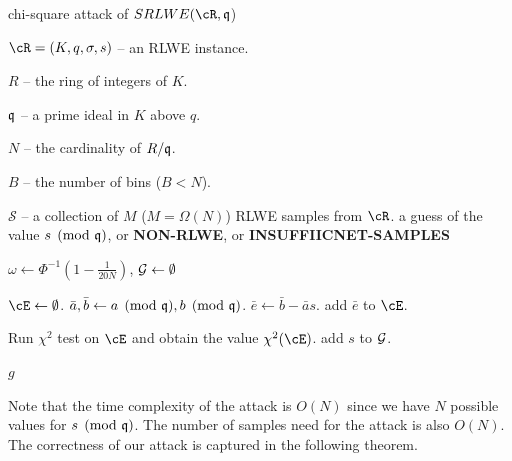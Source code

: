 \documentclass{amsart}
\begin{document}
\begin{algorithm}[H] \label{alg: chi-square}
\caption{chi-square attack of $SRLWE(\cR,\fq$)}          %
\label{IPR}                           %
\begin{algorithmic}[1]              %
     \Require

     $\cR = (K,q,\sigma, s)$ -- an RLWE instance.

     $R$ -- the ring of integers of $K$.

     $\mathfrak{q}$ -- a prime ideal in $K$ above $q$.

     $N$ -- the cardinality of $R/\mathfrak{q}$.

     $B$ -- the number of bins ($B < N$).

     $\mathcal{S}$ -- a collection of $M$ ($M = \Omega(N)$) RLWE samples from $\cR$.
    \Ensure a guess of the value $s \pmod{\mathfrak{q}}$, or {\bf NON-RLWE}, or {\bf INSUFFIICNET-SAMPLES}

    \State $\omega \gets \Phi^{-1}(1- \frac{1}{20N})$, $\mathcal{G} \gets \emptyset$

        \State $\cE \gets \emptyset$.
            \State $\bar{a}, \bar{b} \gets a \pmod{\mathfrak{q}}, b \pmod{\mathfrak{q}}$.
            \State $\bar{e} \gets \bar{b} - \bar{a}s$.
            \State add $\bar{e}$ to $\cE$.
        \EndFor

        \State Run $\chi^2$ test on $\cE$ and obtain the value $\chi^2(\cE)$.
            \State add $s$ to $\mathcal{G}$.
        \EndIf
    \EndFor


        \Return $g$
    \Else

    \EndIf

\end{algorithmic}
\end{algorithm}

Note that the time complexity of the attack is $O(N)$ since we have $N$ possible values for $s \pmod {\mathfrak{q}}$. The number of samples need for the attack is also $O(N)$. The correctness of our attack is captured in the following theorem.
\end{document}
